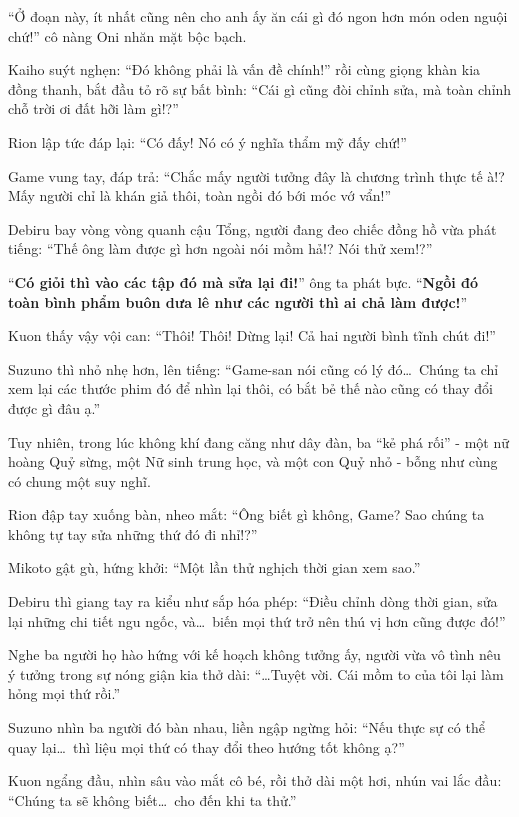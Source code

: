 \documentclass[../main.tex]{subfiles}
\begin{document}

``Ở đoạn này, ít nhất cũng nên cho anh ấy ăn cái gì đó ngon hơn món oden nguội chứ!'' cô nàng Oni nhăn mặt bộc bạch.

Kaiho suýt nghẹn: ``Đó không phải là vấn đề chính!'' rồi cùng giọng khàn kia đồng thanh, bắt đầu tỏ rõ sự bất bình: ``Cái gì cũng đòi chỉnh sửa, mà toàn chỉnh chỗ trời ơi đất hỡi làm gì!?''

Rion lập tức đáp lại: ``Có đấy! Nó có ý nghĩa thẩm mỹ đấy chứ!''

Game vung tay, đáp trả: ``Chắc mấy người tưởng đây là chương trình thực tế à!? Mấy người chỉ là khán giả thôi, toàn ngồi đó bới móc vớ vẩn!''

Debiru bay vòng vòng quanh cậu Tổng, người đang đeo chiếc đồng hồ vừa phát tiếng: ``Thế ông làm được gì hơn ngoài nói mồm hả!? Nói thử xem!?''

``\textbf{Có giỏi thì vào các tập đó mà sửa lại đi!}'' ông ta phát bực. ``\textbf{Ngồi đó toàn bình phẩm buôn dưa lê như các người thì ai chả làm được!}''

Kuon thấy vậy vội can: ``Thôi! Thôi! Dừng lại! Cả hai người bình tĩnh chút đi!''

Suzuno thì nhỏ nhẹ hơn, lên tiếng: ``Game-san nói cũng có lý đó\dots\ Chúng ta chỉ xem lại các thước phim đó để nhìn lại thôi, có bắt bẻ thế nào cũng có thay đổi được gì đâu ạ.''

Tuy nhiên, trong lúc không khí đang căng như dây đàn, ba ``kẻ phá rối'' - một nữ hoàng Quỷ sừng, một Nữ sinh trung học, và một con Quỷ nhỏ - bỗng như cùng có chung một suy nghĩ.

Rion đập tay xuống bàn, nheo mắt: ``Ông biết gì không, Game? Sao chúng ta không tự tay sửa những thứ đó đi nhỉ!?''

Mikoto gật gù, hứng khởi: ``Một lần thử nghịch thời gian xem sao.''

Debiru thì giang tay ra kiểu như sắp hóa phép: ``Điều chỉnh dòng thời gian, sửa lại những chi tiết ngu ngốc, và\dots\ biến mọi thứ trở nên thú vị hơn cũng được đó!''

Nghe ba người họ hào hứng với kế hoạch không tưởng ấy, người vừa vô tình nêu ý tưởng trong sự nóng giận kia thở dài: ``\dots Tuyệt vời. Cái mồm to của tôi lại làm hỏng mọi thứ rồi.''

Suzuno nhìn ba người đó bàn nhau, liền ngập ngừng hỏi: ``Nếu thực sự có thể quay lại\dots\ thì liệu mọi thứ có thay đổi theo hướng tốt không ạ?''

Kuon ngẩng đầu, nhìn sâu vào mắt cô bé, rồi thở dài một hơi, nhún vai lắc đầu: ``Chúng ta sẽ không biết\dots\ cho đến khi ta thử.''
\end{document}
